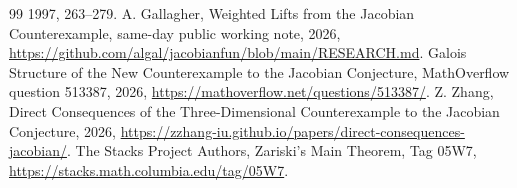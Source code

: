 \documentclass[11pt]{article}
\theoremstyle{remark}
\begin{document}
\begin{thebibliography}{99}
1997, 263--279.
 A. Gallagher, Weighted Lifts from the Jacobian
Counterexample, same-day public working note, 2026,
\url{https://github.com/algal/jacobianfun/blob/main/RESEARCH.md}.
 Galois Structure of the New Counterexample to the Jacobian
Conjecture, MathOverflow question 513387, 2026,
\url{https://mathoverflow.net/questions/513387/}.
 Z. Zhang, Direct Consequences of the Three-Dimensional
Counterexample to the Jacobian Conjecture, 2026,
\url{https://zzhang-iu.github.io/papers/direct-consequences-jacobian/}.
 The Stacks Project Authors, Zariski's Main Theorem,
Tag 05W7, \url{https://stacks.math.columbia.edu/tag/05W7}.
\end{thebibliography}
\end{document}
